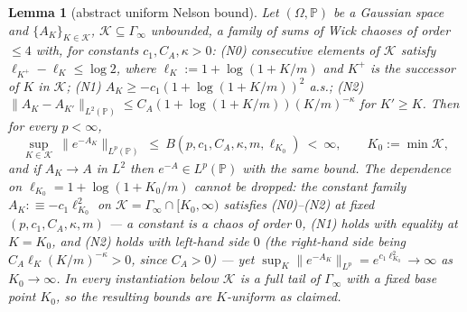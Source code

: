 \documentclass[11pt,a4paper]{article}
\theoremstyle{plain}
\newtheorem{lemma}[theorem]{Lemma}
\theoremstyle{definition}
\newcommand{\PP}{\mathbb{P}}
\begin{document}
\begin{lemma}[abstract uniform Nelson bound]\label{lem:nelson}
Let $(\Omega,\PP)$ be a Gaussian space and $\{A_K\}_{K\in\mathcal K}$,
$\mathcal K\subseteq\Gamma_\infty$ unbounded, a family of sums of Wick
chaoses of order $\le4$ with, for constants $c_1,C_A,\kappa>0$:
\emph{(N0)} consecutive elements of $\mathcal K$ satisfy
$\ell_{K^+}-\ell_K\le\log2$, where $\ell_K:=1+\log(1+K/m)$ and $K^+$ is the
successor of $K$ in $\mathcal K$;
\emph{(N1)} $A_K\ge-c_1(1+\log(1+K/m))^2$ a.s.;
\emph{(N2)} $\|A_K-A_{K'}\|_{L^2(\PP)}\le C_A(1+\log(1+K/m))
(K/m)^{-\kappa}$ for $K'\ge K$.
Then for every $p<\infty$,
\[
 \sup_{K\in\mathcal K}\ \bigl\|e^{-A_K}\bigr\|_{L^p(\PP)}\ \le\
 B(p,c_1,C_A,\kappa,m,\ell_{K_0})\ <\ \infty,\qquad K_0:=\min\mathcal K,
\]
and if $A_K\to A$ in $L^2$ then $e^{-A}\in L^p(\PP)$ with the same bound.
The dependence on $\ell_{K_0}=1+\log(1+K_0/m)$ cannot be dropped: the constant
family $A_K:\equiv-c_1\ell_{K_0}^2$ on
$\mathcal K=\Gamma_\infty\cap[K_0,\infty)$ satisfies (N0)--(N2) at fixed
$(p,c_1,C_A,\kappa,m)$ --- a constant is a chaos of order $0$, (N1) holds with
equality at $K=K_0$, and (N2) holds with left-hand side $0$ (the right-hand side
being $C_A\ell_K(K/m)^{-\kappa}>0$, since $C_A>0$) --- yet
$\sup_K\|e^{-A_K}\|_{L^p}=e^{c_1\ell_{K_0}^2}\to\infty$ as $K_0\to\infty$.
In every instantiation below $\mathcal K$ is a full tail of $\Gamma_\infty$ with a
\emph{fixed} base point $K_0$, so the resulting bounds are $K$-uniform as claimed.
\end{lemma}
\end{document}
